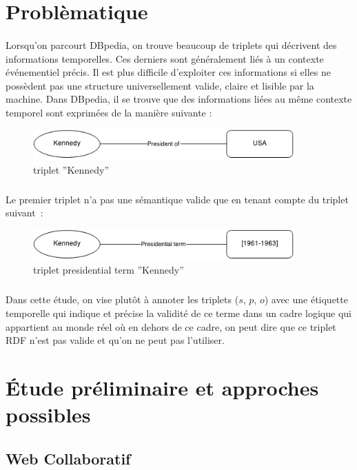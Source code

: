 \section{Problèmatique}
\paragraph{}
Lorsqu’on parcourt DBpedia, on trouve beaucoup de triplets qui décrivent des informations temporelles. Ces derniers sont généralement liés à un contexte événementiel précis.
Il est plus difficile d’exploiter ces informations si elles ne possèdent pas une structure universellement valide, claire et lisible par la machine. Dans DBpedia, il se trouve que des informations liées au même contexte temporel sont exprimées de la manière suivante : 
\begin{figure}[H]
        \centering
                \centering
                \includegraphics[width=10cm]{ken.png}
               \caption{triplet ''Kennedy''}

\end{figure}
\subparagraph{}
Le premier triplet n'a pas une sémantique valide que en tenant compte du triplet suivant~: 
\begin{figure}[H]
        \centering
                \centering
                \includegraphics[width=10cm]{presidterm.png}
               \caption{triplet presidential term ''Kennedy''}

\end{figure}
\subparagraph{}
Dans cette étude, on vise plutôt à annoter les triplets ($s$, $p$, $o$) avec une étiquette temporelle qui indique et précise la validité de ce terme dans un cadre logique qui appartient au monde réel où en dehors de ce cadre, on peut dire que ce triplet RDF n’est pas valide et qu’on ne peut pas l’utiliser.

\section{Étude préliminaire et approches possibles}
\subsection{Web Collaboratif}
